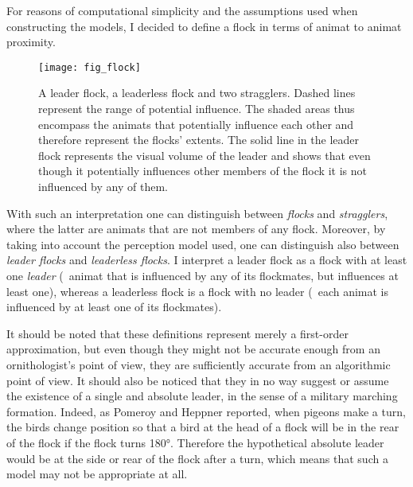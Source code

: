 For reasons of computational simplicity and the assumptions used when constructing the models, I decided to define a flock in terms of animat to animat proximity.  

\begin{figure}
	\texttt{[image: fig\_flock]}
	\caption{A leader flock, a leaderless flock and two stragglers. Dashed lines represent the range of potential influence. The shaded areas thus encompass the animats that potentially influence each other and therefore represent the flocks' extents. The solid line in the leader flock represents the visual volume of the leader and shows that even though it potentially influences other members of the flock it is not influenced by any of them.}
	\label{fig:flock}
\end{figure}

With such an interpretation one can distinguish between \emph{flocks} and \emph{stragglers}, where the latter are animats that are not members of any flock. Moreover, by taking into account the perception model used, one can distinguish also between \emph{leader flocks} and \emph{leaderless flocks}. I interpret a leader flock as a flock with at least one \emph{leader} (\ie\ animat that is  influenced by any of its flockmates, but influences at least one), whereas a leaderless flock is a flock with no leader (\ie\ each animat is influenced by at least one of its flockmates). 

It should be noted that these definitions represent merely a first-order approximation, but even though they might not be accurate enough from an ornithologist's point of view, they are sufficiently accurate from an algorithmic point of view. It should also be noticed that they in no way suggest or assume the existence of a single and absolute leader, in the sense of a military marching formation. Indeed, as Pomeroy and Heppner \cite{pomeroy:1992} reported, when pigeons make a turn, the birds change position so that a bird at the head of a flock will be in the rear of the flock if the flock turns \ang{180}. Therefore the hypothetical absolute leader would be at the side or rear of the flock after a turn, which means that such a model may not be appropriate at all. 

